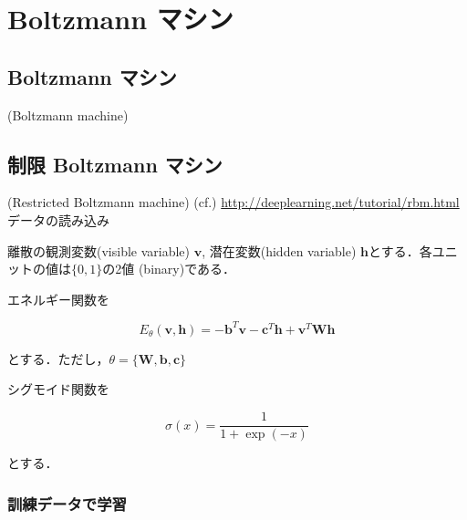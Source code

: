 \section{Boltzmann マシン}
\subsection{Boltzmann マシン}
(Boltzmann machine)
\subsection{制限 Boltzmann マシン}
(Restricted Boltzmann machine) 
(cf.) \url{http://deeplearning.net/tutorial/rbm.html}
データの読み込み






離散の観測変数(visible variable) $\mathbf{v}$, 潜在変数(hidden variable) $\mathbf{h}$とする．各ユニットの値は$\{0, 1\}$の2値 (binary)である．

エネルギー関数を


\begin{equation}
E_\theta(\mathbf{v}, \mathbf{h})=-\mathbf{b}^T \mathbf{v} - \mathbf{c}^T \mathbf{h} + \mathbf{v}^T \mathbf{W} \mathbf{h}
\end{equation}


とする．ただし，$\theta=\{\mathbf{W}, \mathbf{b}, \mathbf{c}\}$

シグモイド関数を


\begin{equation}
\sigma(x) = \frac{1}{1+\exp(-x)}
\end{equation}


とする．
\subsubsection{訓練データで学習}

